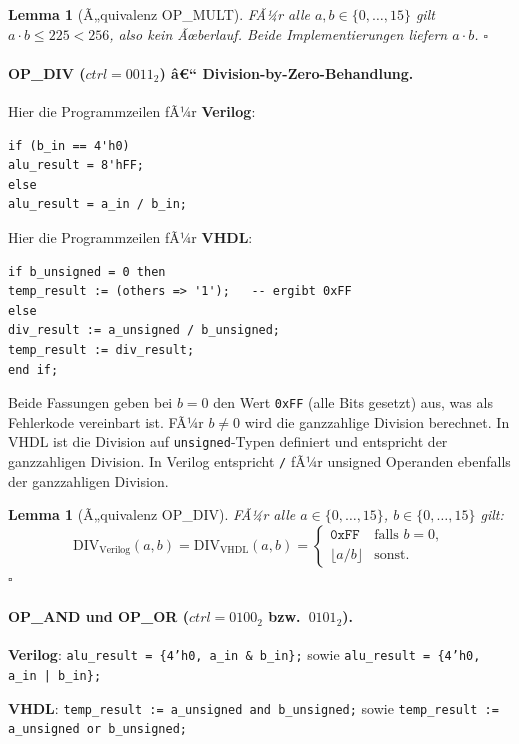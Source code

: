 ﻿\documentclass[12pt,a4paper]{report}
\newtheorem{lemma}[theorem]{Lemma}
\begin{document}
\begin{lemma}[Ã„quivalenz OP\_MULT]
	FÃ¼r alle $a, b \in \{0,\ldots,15\}$ gilt $a \cdot b \leq 225 < 256$, also
	kein Ãœberlauf.  Beide Implementierungen liefern $a \cdot b$. \hfill $\square$
\end{lemma}

\paragraph{OP\_DIV ($ctrl = 0011_2$) â€“ Division-by-Zero-Behandlung.}
Hier die Programmzeilen fÃ¼r \textbf{Verilog}:
\begin{lstlisting}[style=hdlstyle]
if (b_in == 4'h0)
alu_result = 8'hFF;
else
alu_result = a_in / b_in;
\end{lstlisting}
Hier die Programmzeilen fÃ¼r \textbf{VHDL}:
\begin{lstlisting}[style=hdlstyle]
if b_unsigned = 0 then
temp_result := (others => '1');   -- ergibt 0xFF
else
div_result := a_unsigned / b_unsigned;
temp_result := div_result;
end if;
\end{lstlisting}

Beide Fassungen geben bei $b = 0$ den Wert \texttt{0xFF} (alle Bits gesetzt)
aus, was als Fehlerkode vereinbart ist.  FÃ¼r $b \neq 0$ wird die ganzzahlige
Division berechnet.  In VHDL ist die Division auf \texttt{unsigned}-Typen
definiert und entspricht der ganzzahligen Division.  In Verilog entspricht
\texttt{/} fÃ¼r unsigned Operanden ebenfalls der ganzzahligen Division.

\begin{lemma}[Ã„quivalenz OP\_DIV]
	\label{lem:div_equiv}
	FÃ¼r alle $a \in \{0,\ldots,15\}$, $b \in \{0,\ldots,15\}$ gilt:
	\[
	\mathrm{DIV}_\mathrm{Verilog}(a,b) = \mathrm{DIV}_\mathrm{VHDL}(a,b)
	= \begin{cases} \mathtt{0xFF} & \text{falls } b = 0, \\ \lfloor a/b \rfloor & \text{sonst.} \end{cases}
	\]
	\hfill $\square$
\end{lemma}

\paragraph{OP\_AND und OP\_OR ($ctrl = 0100_2$ bzw.\ $0101_2$).}

\textbf{Verilog}: \texttt{alu\_result = \{4'h0, a\_in \& b\_in\};}
sowie \texttt{alu\_result = \{4'h0, a\_in | b\_in\};}

\textbf{VHDL}: \texttt{temp\_result := a\_unsigned and b\_unsigned;}
sowie \texttt{temp\_result := a\_un\newline signed or b\_unsigned;}
\end{document}
